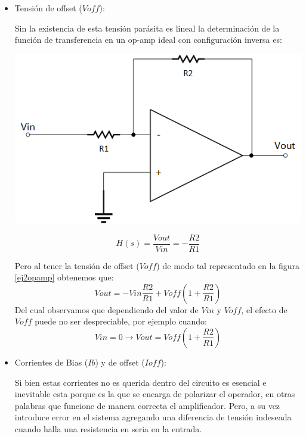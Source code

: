 \begin{itemize}
    \item Tensión de offset ($Voff$): 
    
    Sin la existencia de esta tensión parásita es lineal la determinación de la función de transferencia en un op-amp ideal con configuración inversa es:
    
    \begin{minipage}{.45\textwidth}
        \centering
        \includegraphics[scale = 0.5]{../Ejercicio2-MediciondeBias/Informe/inversopamp.png}
    \end{minipage}
    \begin{minipage}{.45\textwidth}
        $$H(s) = \frac{Vout}{Vin} = -\frac{R2}{R1}$$
    \end{minipage}

    Pero al tener la tensión de offset ($Voff$) de modo tal representado en la figura \ref{ej2opamp} obtenemos que:
    $$Vout = -Vin\frac{R2}{R1} + Voff\left(1 + \frac{R2}{R1}\right)$$
    Del cual observamos que dependiendo del valor de $Vin$ y $Voff$, el efecto de $Voff$ puede no ser despreciable, por ejemplo cuando:
    $$Vin = 0 \longrightarrow Vout = Voff \left(1 + \frac{R2}{R1}\right)$$
    
    \item Corrientes de Bias ($Ib$) y de offset ($Ioff$):
    
    Si bien estas corrientes no es querida dentro del circuito es esencial e inevitable esta porque es la que se encarga de polarizar el operador, en otras palabras que funcione de manera correcta el amplificador. Pero, a su vez introduce error en el sistema agregando una diferencia de tensión indeseada cuando halla una resistencia en seria en la entrada.
    
\end{itemize}

